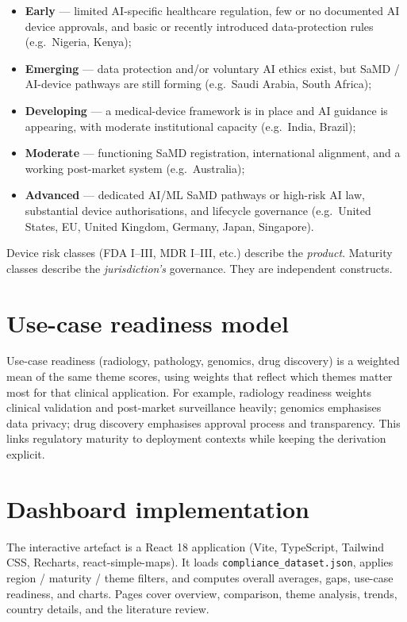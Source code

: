 \documentclass[12pt,a4paper]{report}
\begin{document}
\begin{itemize}
  \item \textbf{Early} --- limited AI-specific healthcare regulation, few or no documented AI device approvals, and basic or recently introduced data-protection rules (e.g.\ Nigeria, Kenya);
  \item \textbf{Emerging} --- data protection and/or voluntary AI ethics exist, but SaMD / AI-device pathways are still forming (e.g.\ Saudi Arabia, South Africa);
  \item \textbf{Developing} --- a medical-device framework is in place and AI guidance is appearing, with moderate institutional capacity (e.g.\ India, Brazil);
  \item \textbf{Moderate} --- functioning SaMD registration, international alignment, and a working post-market system (e.g.\ Australia);
  \item \textbf{Advanced} --- dedicated AI/ML SaMD pathways or high-risk AI law, substantial device authorisations, and lifecycle governance (e.g.\ United States, EU, United Kingdom, Germany, Japan, Singapore).
\end{itemize}

Device risk classes (FDA I--III, MDR I--III, etc.) describe the \emph{product}. Maturity classes describe the \emph{jurisdiction's} governance. They are independent constructs.

\section{Use-case readiness model}

Use-case readiness (radiology, pathology, genomics, drug discovery) is a weighted mean of the same theme scores, using weights that reflect which themes matter most for that clinical application. For example, radiology readiness weights clinical validation and post-market surveillance heavily; genomics emphasises data privacy; drug discovery emphasises approval process and transparency. This links regulatory maturity to deployment contexts while keeping the derivation explicit.

\section{Dashboard implementation}

The interactive artefact is a React 18 application (Vite, TypeScript, Tailwind CSS, Recharts, react-simple-maps). It loads \texttt{compliance\_dataset.json}, applies region / maturity / theme filters, and computes overall averages, gaps, use-case readiness, and charts. Pages cover overview, comparison, theme analysis, trends, country details, and the literature review.
\end{document}
